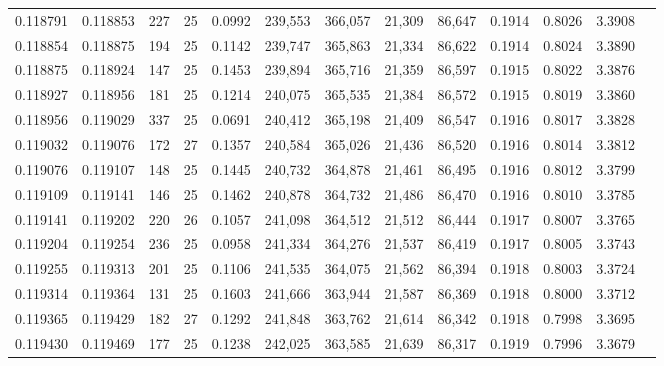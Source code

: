 \begin{tabular}{rrrrrrrrrrrrr}
0.118791 & 0.118853 & 227 &  25 &                                     0.0992 & 239,553 & 366,057 &  21,309 &  86,647 & 0.1914 & 0.8026 & 3.3908 \\
0.118854 & 0.118875 & 194 &  25 &                                     0.1142 & 239,747 & 365,863 &  21,334 &  86,622 & 0.1914 & 0.8024 & 3.3890 \\
0.118875 & 0.118924 & 147 &  25 &                                     0.1453 & 239,894 & 365,716 &  21,359 &  86,597 & 0.1915 & 0.8022 & 3.3876 \\
0.118927 & 0.118956 & 181 &  25 &                                     0.1214 & 240,075 & 365,535 &  21,384 &  86,572 & 0.1915 & 0.8019 & 3.3860 \\
0.118956 & 0.119029 & 337 &  25 &                                     0.0691 & 240,412 & 365,198 &  21,409 &  86,547 & 0.1916 & 0.8017 & 3.3828 \\
0.119032 & 0.119076 & 172 &  27 &                                     0.1357 & 240,584 & 365,026 &  21,436 &  86,520 & 0.1916 & 0.8014 & 3.3812 \\
0.119076 & 0.119107 & 148 &  25 &                                     0.1445 & 240,732 & 364,878 &  21,461 &  86,495 & 0.1916 & 0.8012 & 3.3799 \\
0.119109 & 0.119141 & 146 &  25 &                                     0.1462 & 240,878 & 364,732 &  21,486 &  86,470 & 0.1916 & 0.8010 & 3.3785 \\
0.119141 & 0.119202 & 220 &  26 &                                     0.1057 & 241,098 & 364,512 &  21,512 &  86,444 & 0.1917 & 0.8007 & 3.3765 \\
0.119204 & 0.119254 & 236 &  25 &                                     0.0958 & 241,334 & 364,276 &  21,537 &  86,419 & 0.1917 & 0.8005 & 3.3743 \\
0.119255 & 0.119313 & 201 &  25 &                                     0.1106 & 241,535 & 364,075 &  21,562 &  86,394 & 0.1918 & 0.8003 & 3.3724 \\
0.119314 & 0.119364 & 131 &  25 &                                     0.1603 & 241,666 & 363,944 &  21,587 &  86,369 & 0.1918 & 0.8000 & 3.3712 \\
0.119365 & 0.119429 & 182 &  27 &                                     0.1292 & 241,848 & 363,762 &  21,614 &  86,342 & 0.1918 & 0.7998 & 3.3695 \\
0.119430 & 0.119469 & 177 &  25 &                                     0.1238 & 242,025 & 363,585 &  21,639 &  86,317 & 0.1919 & 0.7996 & 3.3679 \\

\end{tabular}
